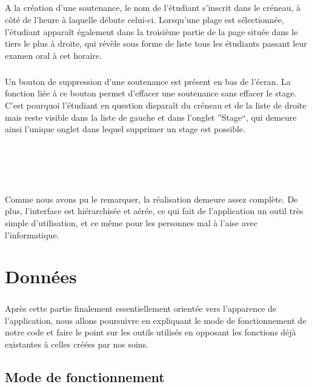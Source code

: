 \documentclass[a4paper,10pt]{report}
\begin{document}
	      \paragraph{}
		A la création d'une soutenance, le nom de l'étudiant s'inscrit dans le créneau, à côté de l'heure à laquelle débute celui-ci.
		Lorsqu'une plage est sélectionnée, l'étudiant apparaît également dans la troisième partie de la page située dans le tiers le plus à droite, qui révèle sous forme de liste tous les étudiants passant leur examen oral à cet horaire.
		
	      \paragraph{}
		Un bouton de suppression d'une soutenance est présent en bas de l'écran.
		La fonction liée à ce bouton permet d'effacer une soutenance sans effacer le stage.
		C'est pourquoi l'étudiant en question disparaît du créneau et de la liste de droite mais reste visible dans la liste de gauche et dans l'onglet ''Stage``, qui demeure ainsi l'unique onglet dans lequel supprimer un stage est possible.
		
		~\\
		~\\
		~\\
	      \paragraph{}
		Comme nous avons pu le remarquer, la réalisation demeure assez complète.
		De plus, l'interface est hiérarchisée et aérée, ce qui fait de l'application un outil très simple d'utilisation, et ce même pour les personnes mal à l'aise avec l'informatique.
		
  \chapter{Données}
      \paragraph{}
	Après cette partie finalement essentiellement orientée vers l'apparence de l'application, nous allons poursuivre en expliquant le mode de fonctionnement de notre code et faire le point sur les outils utilisés en opposant les fonctions déjà existantes à celles créées par nos soins.
		   
    \section{Mode de fonctionnement}
\end{document}
